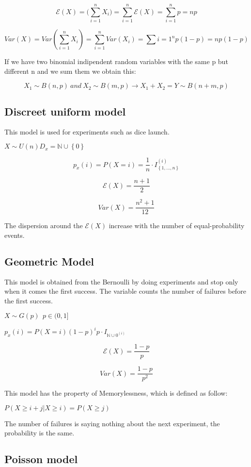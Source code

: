 \documentclass{article}
\begin{document}
$$\mathcal E(X) = \mathcal(\sum_{i=1}^n X_i) = \sum_{i=1}^n \mathcal E(X) = \sum_{i=1}^n p = np$$

$$Var(X) = Var(\sum_{i=1}^n X_i) = \sum_{i=1}^nVar(X_i) = \sum{i=1}^np(1-p) = np(1-p)$$
\bigskip

If we have two binomial indipendent random variables with the same p but different n and we sum them we obtain this:

$$X_1 \sim B(n,p) \ and \ X_2 \sim B(m,p) \rightarrow X_1 + X_2 = Y \sim B(n+m,p)$$


\subsection{Discreet uniform model}

This model is used for experiments such as dice launch.

$X \sim U(n) D_x = \mathbb{N} \cup \left\{0\right\}$

$$p_x(i) = P(X = i) = \frac{1}{n} \cdot I_\left\{1,...,n\right\}^(i)$$
\bigskip

$$\mathcal E(X) = \frac{n+1}{2}$$

$$Var(X) = \frac{n^2 +1}{12}$$

The dispersion around the $\mathcal E(X)$ increase with the number of equal-probability events.


\subsection{Geometric Model}

This model is obtained from the Bernoulli by doing experiments and stop only when it comes the first success. The variable counts the number of failures before the first success. 
\bigskip

$X \sim G(p) \ \ p \in (0,1]$

$p_x(i) = P(X=i) (1-p)^i p \cdot I_{\mathbb{N} \cup {0}^(i)}$
\bigskip

$$\mathcal E(X) = \frac{1-p}{p}$$

$$Var(X) = \frac{1-p}{p^2}$$
\bigskip

This model has the property of Memorylessness, which is defined as follow:

$P(X \geq i + j| X \geq i) = P(X \geq j)$

The number of failures is saying nothing about the next experiment, the probability is the same.

\subsection{Poisson model}
\end{document}
